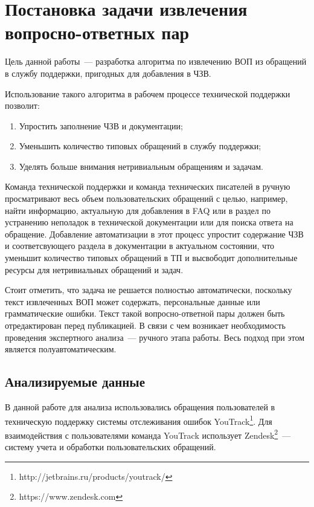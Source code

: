 \chapter{Постановка задачи извлечения вопросно-ответных пар}
\label{chap:task}

Цель данной работы~--- разработка алгоритма по извлечению ВОП из обращений в службу поддержки, пригодных для добавления в ЧЗВ. 

Использование такого алгоритма в рабочем процессе технической поддержки позволит:

\begin{enumerate}
\item Упростить заполнение ЧЗВ и документации;
\item Уменьшить количество типовых обращений в службу поддержки;
\item Уделять больше внимания нетривиальным обращениям и задачам.
\end{enumerate}

Команда технической поддержки и команда технических писателей в ручную просматривают весь объем пользовательских обращений с целью, например, найти информацию, актуальную для добавления в FAQ или в раздел по устранению неполадок в  технической документации или для поиска ответа на обращение. Добавление автоматизации в этот процесс упростит содержание ЧЗВ и соответсвующего раздела в документации в актуальном состоянии, что уменьшит количество типовых обращений в ТП и высвободит дополнительные ресурсы для нетривиальных обращений и задач. 

Стоит отметить, что задача не решается полностью автоматически, поскольку текст извлеченных ВОП может содержать, персональные данные или грамматические ошибки. Текст такой вопросно-ответной пары должен быть отредактирован перед публикацией. В связи с чем возникает необходимость проведения экспертного анализа~--- ручного этапа работы. Весь подход при этом является полуавтоматическим.

\section{Анализируемые данные}
\label{sec:data}
В данной работе для анализа использовались обращения пользователей в техническую поддержку системы отслеживания ошибок YouTrack\footnote{http://jetbrains.ru/products/youtrack/}. Для взаимодействия с пользователями команда YouTrack использует Zendesk\footnote{https://www.zendesk.com}~--- систему учета и обработки пользовательских обращений.

